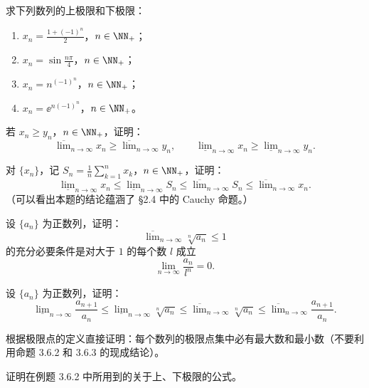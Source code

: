 \begin{xexercise}[1]
求下列数列的上极限和下极限：
  \begin{enumerate}[label=(\arabic*)]
    \item $x_n=\frac{1+(-1)^n}{2}$，$n\in\NN_+$；
    \item $x_n=\sin\frac{n\pi}{4}$，$n\in\NN_+$；
    \item $x_n=n^{(-1)^n}$，$n\in\NN_+$；
    \item $x_n=\ee^{n(-1)^n}$，$n\in\NN_+$。
  \end{enumerate}
\end{xexercise}

\begin{xexercise}[2]
若 $x_n\geqslant y_n$，$n\in\NN_+$，证明：
  \[
    \overline{\lim}_{n\to\infty}x_n\geqslant\overline{\lim}_{n\to\infty}y_n,
    \qquad
    \underline{\lim}_{n\to\infty}x_n\geqslant\underline{\lim}_{n\to\infty}y_n.
  \]
\end{xexercise}

\begin{xexercise}[3]
对 $\{x_n\}$，记 $S_n=\frac1n\sum_{k=1}^{n}x_k$，$n\in\NN_+$，证明：
  \[
    \underline{\lim}_{n\to\infty}x_n
    \leqslant\underline{\lim}_{n\to\infty}S_n
    \leqslant\overline{\lim}_{n\to\infty}S_n
    \leqslant\overline{\lim}_{n\to\infty}x_n.
  \]
  （可以看出本题的结论蕴涵了 §2.4 中的 Cauchy 命题。）
\end{xexercise}

\begin{xexercise}[4]
设 $\{a_n\}$ 为正数列，证明：
  \[
    \overline{\lim}_{n\to\infty}\sqrt[n]{a_n}\leqslant1
  \]
  的充分必要条件是对大于 $1$ 的每个数 $l$ 成立
  \[
    \lim_{n\to\infty}\frac{a_n}{l^n}=0.
  \]
\end{xexercise}

\begin{xexercise}[5]
设 $\{a_n\}$ 为正数列，证明：
  \[
    \underline{\lim}_{n\to\infty}\frac{a_{n+1}}{a_n}
    \leqslant\underline{\lim}_{n\to\infty}\sqrt[n]{a_n}
    \leqslant\overline{\lim}_{n\to\infty}\sqrt[n]{a_n}
    \leqslant\overline{\lim}_{n\to\infty}\frac{a_{n+1}}{a_n}.
  \]
\end{xexercise}

\begin{xexercise}[6]
根据极限点的定义直接证明：每个数列的极限点集中必有最大数和最小数（不要利用命题 3.6.2 和 3.6.3 的现成结论）。
\end{xexercise}

\begin{xexercise}[7]
证明在例题 3.6.2 中所用到的关于上、下极限的公式。
\end{xexercise}

